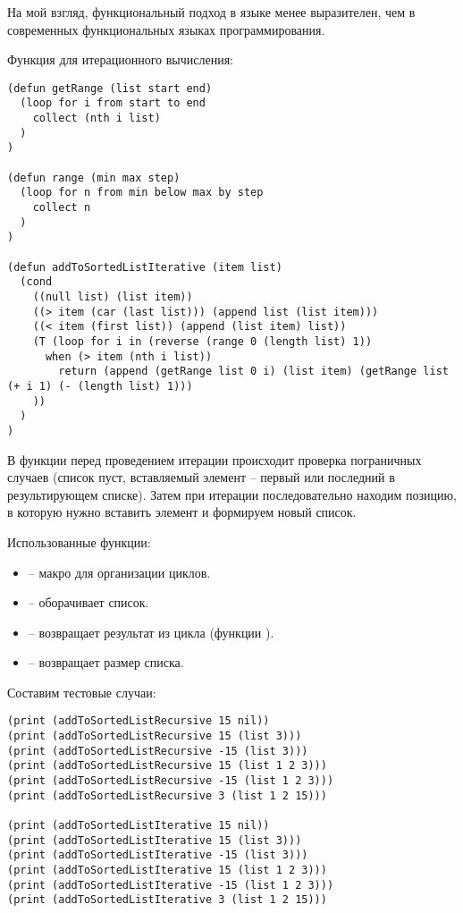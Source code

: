 \documentclass[a4paper,14pt]{extarticle}
\begin{document}
На мой взгляд, функциональный подход в языке  менее выразителен, чем
в современных функциональных языках программирования.

Функция для итерационного вычисления:

\begin{lstlisting}
(defun getRange (list start end)
  (loop for i from start to end
    collect (nth i list)
  )
)

(defun range (min max step)
  (loop for n from min below max by step
    collect n
  )
)

(defun addToSortedListIterative (item list)
  (cond
    ((null list) (list item))
    ((> item (car (last list))) (append list (list item)))
    ((< item (first list)) (append (list item) list))
    (T (loop for i in (reverse (range 0 (length list) 1))
      when (> item (nth i list))
        return (append (getRange list 0 i) (list item) (getRange list (+ i 1) (- (length list) 1)))
    ))
  )
)
\end{lstlisting}

В функции  перед проведением итерации происходит
проверка пограничных случаев (список пуст, вставляемый элемент -- первый или
последний в результирующем списке). Затем при итерации последовательно находим
позицию, в которую нужно вставить элемент и формируем новый список.

Использованные функции:
\begin{itemize}
    \item {} -- макро для организации циклов.
    \item {} -- оборачивает список.
    \item {} -- возвращает результат из цикла (функции ).
    \item {} -- возвращает размер списка. 
\end{itemize}

Составим тестовые случаи:

\begin{lstlisting}
(print (addToSortedListRecursive 15 nil))
(print (addToSortedListRecursive 15 (list 3)))
(print (addToSortedListRecursive -15 (list 3)))
(print (addToSortedListRecursive 15 (list 1 2 3)))
(print (addToSortedListRecursive -15 (list 1 2 3)))
(print (addToSortedListRecursive 3 (list 1 2 15)))

(print (addToSortedListIterative 15 nil))
(print (addToSortedListIterative 15 (list 3)))
(print (addToSortedListIterative -15 (list 3)))
(print (addToSortedListIterative 15 (list 1 2 3)))
(print (addToSortedListIterative -15 (list 1 2 3)))
(print (addToSortedListIterative 3 (list 1 2 15)))
\end{lstlisting}
\end{document}
